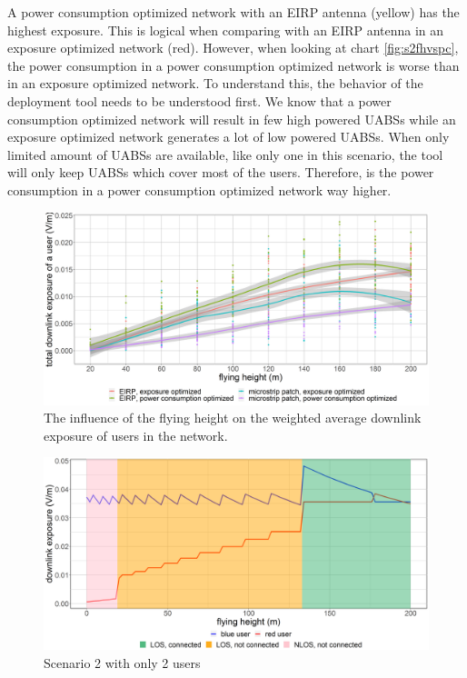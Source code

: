 A power consumption optimized network with an \gls{EIRP} antenna (yellow) has the highest exposure. 
This is logical when comparing with an EIRP antenna in an exposure optimized network (red). 
However, when looking at chart \ref{fig:s2fhvspc}, the power consumption in a power consumption optimized network is worse 
than in an exposure optimized network. To understand this, the behavior of the deployment tool needs to be understood first. 
We know that a power consumption optimized network will result in few high powered \gls{UABS}s while an exposure optimized network 
generates a lot of low powered \gls{UABS}s. When only limited amount of \gls{UABS}s are available, 
like only one in this scenario, the tool will only keep \gls{UABS}s which cover most of the users. 
Therefore, is the power consumption in a power consumption optimized network way higher. 

\begin{figure}[h!]
  \includegraphics[width=\textwidth]{../results/s2/fhvsdl.png}
  \caption{The influence of the flying height on the weighted average downlink exposure of users in the network.}
  \label{fig:s2fhvsdl}
\end{figure}

\begin{figure}[bh!]
  \includegraphics[width=\textwidth]{../results/s1/prove.png}
  \caption{Scenario 2 with only 2 users}
  \label{fig:pcsar}
\end{figure}

